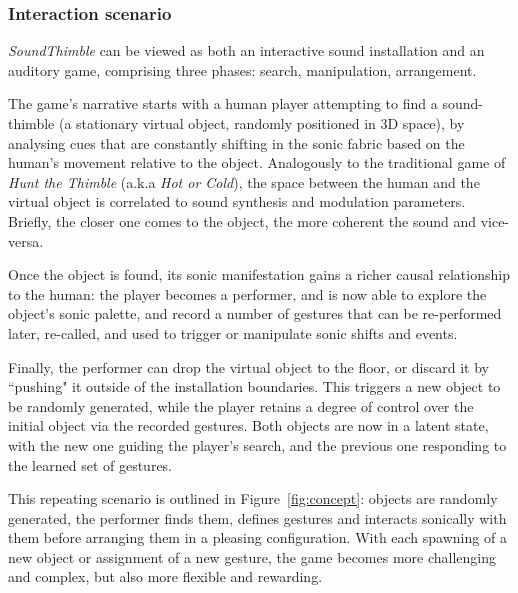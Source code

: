 \documentclass{nime-alternate}
\begin{document}
\subsubsection{Interaction scenario}

\textit{SoundThimble} can be viewed as both an interactive sound installation and an auditory game, comprising three phases: search, manipulation, arrangement.


The game's narrative starts with a human player attempting to find a sound-thimble (a stationary virtual object, randomly positioned in 3D space), by analysing cues that are constantly shifting in the sonic fabric based on the human's movement relative to the object. Analogously to the traditional game of \textit{Hunt the Thimble} (a.k.a \textit{Hot or Cold}), the space between the human and the virtual object is correlated to sound synthesis and modulation parameters. Briefly, the closer one comes to the object, the more coherent the sound and vice-versa. 

Once the object is found, its sonic manifestation gains a richer causal relationship to the human: the player becomes a performer, and is now able to explore the object's sonic palette, and record a number of gestures that can be re-performed later, re-called, and used to trigger or manipulate sonic shifts and events.

Finally, the performer can drop the virtual object to the floor, or discard it by ``pushing" it outside of the installation boundaries. This triggers a new object to be randomly generated, while the player retains a degree of control over the initial object via the recorded gestures. Both objects are now in a latent state, with the new one guiding the player's search, and the previous one responding to the learned set of gestures.

This repeating scenario is outlined in Figure~\ref{fig:concept}: objects are randomly generated, the performer finds them, defines gestures and interacts sonically with them before arranging them in a pleasing configuration. With each spawning of a new object or assignment of a new gesture, the game becomes more challenging and complex, but also more flexible and rewarding.
\end{document}
